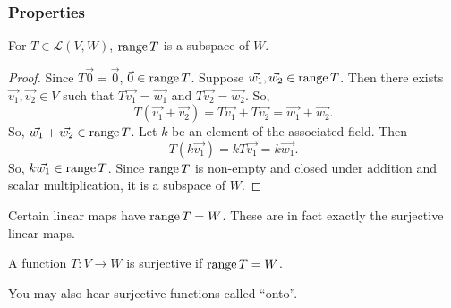 \subsubsection{Properties}
\begin{theorem}
	For $T \in \mathcal{L}(V,W)$, $\operatorname{range}{T}$ is a subspace of $W$.
\end{theorem}
\begin{proof}
	Since $T\vec{0} = \vec{0}$, $\vec{0} \in \operatorname{range}{T}$.
	Suppose $\vec{w_1}, \vec{w_2} \in \operatorname{range}{T}$.
	Then there exists $\vec{v_1}, \vec{v_2} \in V$ such that $T\vec{v_1} = \vec{w_1}$ and $T\vec{v_2} = \vec{w_2}$.
	So,
	\begin{equation*}
		T(\vec{v_1} + \vec{v_2}) = T\vec{v_1} + T\vec{v_2} = \vec{w_1} + \vec{w_2}.
	\end{equation*}
	So, $\vec{w_1} + \vec{w_2} \in \operatorname{range}{T}$.
	Let $k$ be an element of the associated field.
	Then
	\begin{equation*}
		T(k\vec{v_1}) = kT\vec{v_1} = k\vec{w_1}.
	\end{equation*}
	So, $k\vec{w_1} \in \operatorname{range}{T}$.
	Since $\operatorname{range}{T}$ is non-empty and closed under addition and scalar multiplication, it is a subspace of $W$.
\end{proof}

Certain linear maps have $\operatorname{range}{T} = W$.
These are in fact exactly the surjective linear maps.
\begin{definition}
	A function $T: V \to W$ is surjective if $\operatorname{range}{T} = W$.
\end{definition}
You may also hear surjective functions called ``onto''.